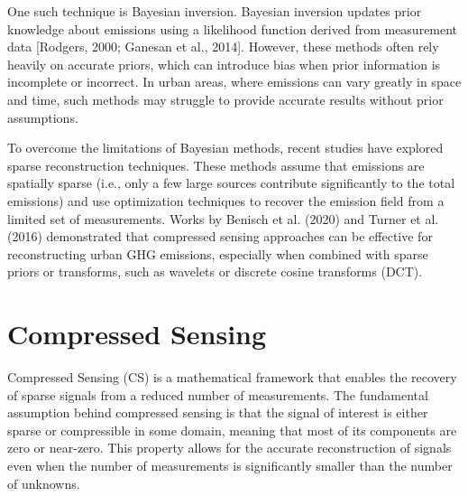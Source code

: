 One such technique is Bayesian inversion.
Bayesian inversion updates prior knowledge about emissions using a likelihood function derived from measurement data [Rodgers, 2000; Ganesan et al., 2014].
However, these methods often rely heavily on accurate priors, which can introduce bias when prior information is incomplete or incorrect.
In urban areas, where emissions can vary greatly in space and time, such methods may struggle to provide accurate results without prior assumptions.

To overcome the limitations of Bayesian methods, recent studies have explored sparse reconstruction techniques.
These methods assume that emissions are spatially sparse (i.e., only a few large sources contribute significantly to the total emissions) and use optimization techniques to recover the emission field from a limited set of measurements.
Works by Benisch et al. (2020) and Turner et al. (2016) demonstrated that compressed sensing approaches can be effective for reconstructing urban GHG emissions, especially when combined with sparse priors or transforms, such as wavelets or discrete cosine transforms (DCT).



\section{Compressed Sensing}
Compressed Sensing (CS) is a mathematical framework that enables the recovery of sparse signals from a reduced number of measurements.
The fundamental assumption behind compressed sensing is that the signal of interest is either sparse or compressible in some domain, meaning that most of its components are zero or near-zero.
This property allows for the accurate reconstruction of signals even when the number of measurements is significantly smaller than the number of unknowns.

